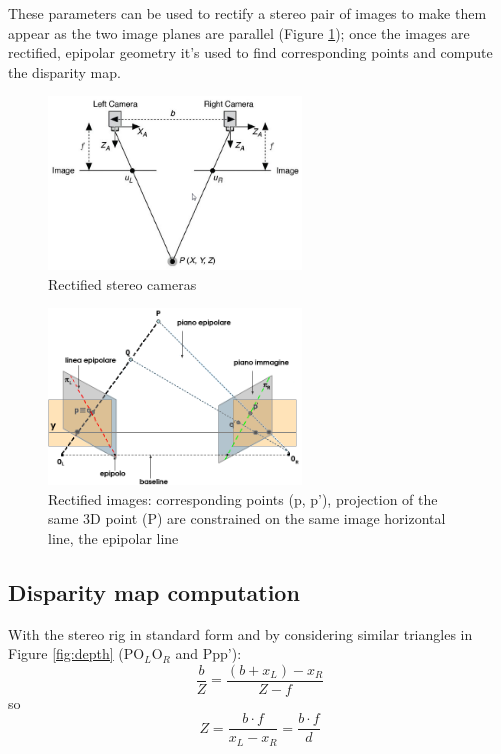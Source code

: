 These parameters can be used to rectify a stereo pair of images to make them appear as the two image planes are parallel (Figure \ref{fig:rect_stereo}); once the images are rectified, epipolar geometry it's used to find corresponding points and compute the disparity map.
\begin{figure}[h!]
\centering
\includegraphics[width=0.6\textwidth]{./img/rect_stereo.png}
\caption{\small{Rectified stereo cameras}}
\label{fig:rect_stereo}
\end{figure}
\begin{figure}[h!]
\centering
\includegraphics[width=0.6\textwidth]{./img/standard.png}
\caption{\small{Rectified images: corresponding points (p, p'), projection of the same 3D point (P) are constrained on the same image horizontal line, the epipolar line}}
\label{fig:std}
\end{figure}

\newpage
\subsection{Disparity map computation}

With the stereo rig in standard form and by considering similar triangles in Figure \ref{fig:depth} (PO$_{L}$O$_{R}$ and Ppp'): 
$$
\frac{b}{Z} = \frac{(b+x_{L}) - x_{R}}{Z-f} 
$$ 
so
$$
Z = \frac{b \cdot f}{x_{L} - x_{R}} = \frac{b \cdot f}{d}
$$ 

